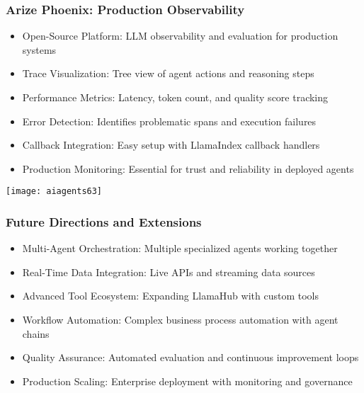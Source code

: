 \begin{frame}[fragile]\frametitle{Arize Phoenix: Production Observability}
      \begin{itemize}
		\item Open-Source Platform: LLM observability and evaluation for production systems
		\item Trace Visualization: Tree view of agent actions and reasoning steps
		\item Performance Metrics: Latency, token count, and quality score tracking
		\item Error Detection: Identifies problematic spans and execution failures
		\item Callback Integration: Easy setup with LlamaIndex callback handlers
		\item Production Monitoring: Essential for trust and reliability in deployed agents
	  \end{itemize}
		\begin{center}
		\texttt{[image: aiagents63]}
		\end{center}	
\end{frame}

\begin{frame}[fragile]\frametitle{Future Directions and Extensions}
      \begin{itemize}
		\item Multi-Agent Orchestration: Multiple specialized agents working together
		\item Real-Time Data Integration: Live APIs and streaming data sources
		\item Advanced Tool Ecosystem: Expanding LlamaHub with custom tools
		\item Workflow Automation: Complex business process automation with agent chains
		\item Quality Assurance: Automated evaluation and continuous improvement loops
		\item Production Scaling: Enterprise deployment with monitoring and governance
	  \end{itemize}
\end{frame}

